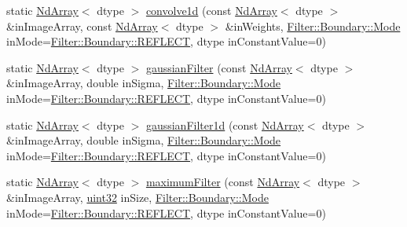 \begin{DoxyCompactItemize}
\item 
static \mbox{\hyperlink{class_num_c_1_1_nd_array}{Nd\+Array}}$<$ dtype $>$ \mbox{\hyperlink{class_num_c_1_1_filters_a5391f92f8fca1b1742ea4eb62261936c}{convolve1d}} (const \mbox{\hyperlink{class_num_c_1_1_nd_array}{Nd\+Array}}$<$ dtype $>$ \&in\+Image\+Array, const \mbox{\hyperlink{class_num_c_1_1_nd_array}{Nd\+Array}}$<$ dtype $>$ \&in\+Weights, \mbox{\hyperlink{struct_num_c_1_1_filter_1_1_boundary_a20ccfbf059139a99eda623c1550a27e3}{Filter\+::\+Boundary\+::\+Mode}} in\+Mode=\mbox{\hyperlink{struct_num_c_1_1_filter_1_1_boundary_a20ccfbf059139a99eda623c1550a27e3a5571d98046aa858b5c79dce8c4c16c04}{Filter\+::\+Boundary\+::\+R\+E\+F\+L\+E\+CT}}, dtype in\+Constant\+Value=0)
\item 
static \mbox{\hyperlink{class_num_c_1_1_nd_array}{Nd\+Array}}$<$ dtype $>$ \mbox{\hyperlink{class_num_c_1_1_filters_aba7428a73a74370033dea5f4c465ff9c}{gaussian\+Filter}} (const \mbox{\hyperlink{class_num_c_1_1_nd_array}{Nd\+Array}}$<$ dtype $>$ \&in\+Image\+Array, double in\+Sigma, \mbox{\hyperlink{struct_num_c_1_1_filter_1_1_boundary_a20ccfbf059139a99eda623c1550a27e3}{Filter\+::\+Boundary\+::\+Mode}} in\+Mode=\mbox{\hyperlink{struct_num_c_1_1_filter_1_1_boundary_a20ccfbf059139a99eda623c1550a27e3a5571d98046aa858b5c79dce8c4c16c04}{Filter\+::\+Boundary\+::\+R\+E\+F\+L\+E\+CT}}, dtype in\+Constant\+Value=0)
\item 
static \mbox{\hyperlink{class_num_c_1_1_nd_array}{Nd\+Array}}$<$ dtype $>$ \mbox{\hyperlink{class_num_c_1_1_filters_a742ee5099aaff16e7e769f5d0d3540e2}{gaussian\+Filter1d}} (const \mbox{\hyperlink{class_num_c_1_1_nd_array}{Nd\+Array}}$<$ dtype $>$ \&in\+Image\+Array, double in\+Sigma, \mbox{\hyperlink{struct_num_c_1_1_filter_1_1_boundary_a20ccfbf059139a99eda623c1550a27e3}{Filter\+::\+Boundary\+::\+Mode}} in\+Mode=\mbox{\hyperlink{struct_num_c_1_1_filter_1_1_boundary_a20ccfbf059139a99eda623c1550a27e3a5571d98046aa858b5c79dce8c4c16c04}{Filter\+::\+Boundary\+::\+R\+E\+F\+L\+E\+CT}}, dtype in\+Constant\+Value=0)
\item 
static \mbox{\hyperlink{class_num_c_1_1_nd_array}{Nd\+Array}}$<$ dtype $>$ \mbox{\hyperlink{class_num_c_1_1_filters_aec5c934314cc94275dd91e9cdd9e5e91}{maximum\+Filter}} (const \mbox{\hyperlink{class_num_c_1_1_nd_array}{Nd\+Array}}$<$ dtype $>$ \&in\+Image\+Array, \mbox{\hyperlink{namespace_num_c_ae685802ca6d3035f2b400b081e3953fa}{uint32}} in\+Size, \mbox{\hyperlink{struct_num_c_1_1_filter_1_1_boundary_a20ccfbf059139a99eda623c1550a27e3}{Filter\+::\+Boundary\+::\+Mode}} in\+Mode=\mbox{\hyperlink{struct_num_c_1_1_filter_1_1_boundary_a20ccfbf059139a99eda623c1550a27e3a5571d98046aa858b5c79dce8c4c16c04}{Filter\+::\+Boundary\+::\+R\+E\+F\+L\+E\+CT}}, dtype in\+Constant\+Value=0)

\end{DoxyCompactItemize}
